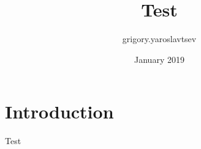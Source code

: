 \documentclass{article}
\title{Test}
\author{grigory.yaroslavtsev }
\date{January 2019}
\begin{document}
\maketitle

\section{Introduction}

Test
\end{document}
